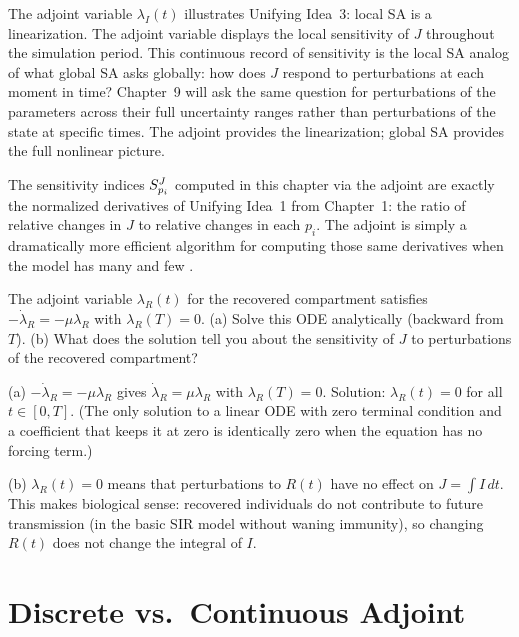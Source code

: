  The adjoint variable $\lambda_I(t)$ illustrates Unifying Idea~3: local SA is a linearization.
The adjoint variable displays the
local sensitivity of $J$ throughout the simulation period.
This continuous record of sensitivity is the local SA analog of
what global SA asks globally: how does $J$ respond to perturbations
at each moment in time? Chapter~9 will ask the same question
for perturbations of the parameters across their full uncertainty
ranges rather than perturbations of the state at specific times.
The adjoint provides the linearization; global SA provides
the full nonlinear picture.

 The sensitivity indices $S_{p_i}^{J}$ computed
in this chapter via the adjoint are exactly the normalized derivatives
of Unifying Idea~1 from Chapter~1: the ratio of relative changes in $J$ to relative
changes in each \POI $p_i$. The adjoint is simply a dramatically
more efficient algorithm for computing those same derivatives
when the model has many \POIs and few \QOIs.

\begin{selfcheck}
The adjoint variable $\lambda_R(t)$ for the recovered compartment
satisfies $-\dot{\lambda}_R = -\mu\lambda_R$ with $\lambda_R(T) = 0$.
(a) Solve this ODE analytically (backward from $T$).
(b) What does the solution tell you about the sensitivity of $J$
    to perturbations of the recovered compartment?
\end{selfcheck}
\begin{scAnswer}
(a) $-\dot{\lambda}_R = -\mu\lambda_R$ gives $\dot{\lambda}_R = \mu\lambda_R$
with $\lambda_R(T) = 0$.
Solution: $\lambda_R(t) = 0$ for all $t \in [0,T]$.
(The only solution to a linear ODE with zero terminal condition and
a coefficient that keeps it at zero is identically zero when the
equation has no forcing term.)

(b) $\lambda_R(t) = 0$ means that perturbations to $R(t)$ have no
effect on $J = \int I\,dt$. This makes biological sense: recovered
individuals do not contribute to future transmission (in the basic
SIR model without waning immunity), so changing $R(t)$ does not
change the integral of $I$.
\end{scAnswer}

\section{Discrete vs.\ Continuous Adjoint}
\label{sec:discretecont}


